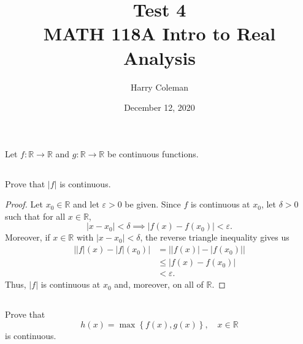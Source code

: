 \documentclass[12pt]{article}
\newenvironment{problem}
    {\begin{lrbox}{\mybox}\begin{minipage}{0.98\textwidth}}
    {\end{minipage}\end{lrbox}\framebox[\textwidth]{\usebox{\mybox}}}
\newcommand{\R}{\mathbb{R}}
\newcommand{\eps}{\varepsilon}
\begin{document}
 
\title{Test 4 \\
    \large MATH 118A Intro to Real Analysis
}
\author{Harry Coleman}
\date{December 12, 2020}
\maketitle

\section{}
\begin{problem}
    Let $f:\R\to\R$ and $g:\R\to\R$ be continuous functions. 
\end{problem}

\subsection{}
\begin{problem}
    Prove that $|f|$ is continuous.
\end{problem}

\begin{proof}
    Let $x_0 \in \R$ and let $\eps > 0$ be given. Since $f$ is continuous at $x_0$, let $\delta > 0$ such that for all $x \in \R$,
    \[
        |x - x_0| < \delta \implies |f(x) - f(x_0)| < \eps.
    \]
    Moreover, if $x \in \R$ with $|x - x_0| < \delta$, the reverse triangle inequality gives us
    \begin{align*}
        \Big| |f|(x) - |f|(x_0) \Big|
            &= \Big| |f(x)| - |f(x_0)| \Big| \\
            &\leq |f(x) - f(x_0)| \\
            &< \eps.
    \end{align*}
    Thus, $|f|$ is continuous at $x_0$ and, moreover, on all of $\R$.
    
\end{proof}

\newpage
\subsection{}
\begin{problem}
    Prove that 
    \begin{equation}
        h(x) = \max \left \{ f(x),g(x)\right \},\quad x\in \R
    \end{equation}
    is continuous.
\end{problem}
\end{document}
